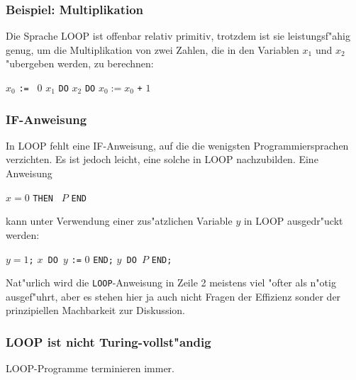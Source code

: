 \subsubsection{Beispiel: Multiplikation}
Die Sprache LOOP ist offenbar relativ primitiv, trotzdem
ist sie leistungsf"ahig genug, um die Multiplikation von zwei
Zahlen, die in den Variablen $x_1$ und $x_2$ "ubergeben werden, 
zu berechnen:

\begin{algorithmic}
\STATE $x_0$ {\tt := } $0$
 $x_1$ {\tt DO}
 $x_2$ {\tt DO}
\STATE{\tt \ \ \ \ \ \ \ \ }$x_0:=x_0$ {\tt +} $1$
\end{algorithmic}

\subsubsection{IF-Anweisung}
In LOOP fehlt eine IF-Anweisung, auf die die wenigsten Programmiersprachen
verzichten. Es ist jedoch leicht, eine solche in LOOP nachzubilden.
Eine Anweisung
\begin{algorithmic}
 $x = 0$ {\tt THEN } $P$ {\tt END}
\end{algorithmic}
kann unter Verwendung einer zus"atzlichen Variable $y$ in LOOP ausgedr"uckt
werden:
\begin{algorithmic}[1]
\STATE $y=1${\tt ;}
$x${\tt\ DO }$y$ {\tt :=} $0$ {\tt END;}
$y${\tt\ DO }$P$ {\tt END;}
\end{algorithmic}
Nat"urlich wird die {\tt LOOP}-Anweisung in Zeile 2 meistens viel "ofter
als n"otig ausgef"uhrt, aber es stehen hier ja auch nicht Fragen
der Effizienz sonder der prinzipiellen Machbarkeit zur Diskussion.

\subsubsection{LOOP ist nicht Turing-vollst"andig}
\begin{satz}
LOOP-Programme terminieren immer.
\end{satz}

